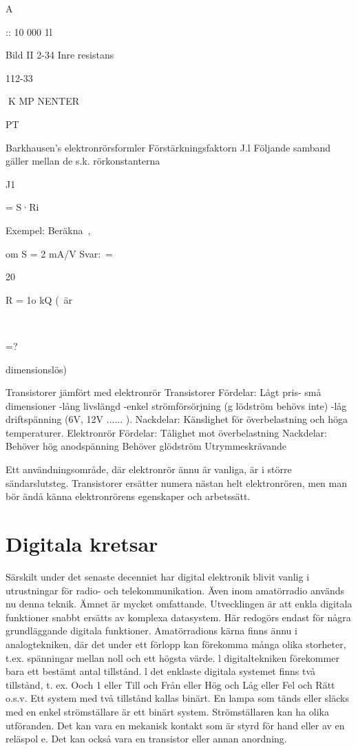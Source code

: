 {{A

:: 10 000 1l

Bild II 2-34 Inre resistans

112-33

K MP NENTER

PT

Barkhausen's elektronrörsformler
Förstärkningsfaktorn J.l
Följande samband gäller mellan de s.k. rörkonstanterna

J1

= S·Ri

Exempel:
Beräkna~,

om S = 2 mA/V
Svar:~=

20

R = 1o kQ
(~är

~

=?

dimensionslös)

Transistorer jämfört med elektronrör
Transistorer
Fördelar:
Lågt pris- små dimensioner -lång livslängd
-enkel strömförsörjning (g lödström behövs
inte) -låg driftspänning (6V, 12V ...... ).
Nackdelar:
Känslighet för överbelastning och höga
temperaturer.
Elektronrör
Fördelar:
Tålighet mot överbelastning
Nackdelar:
Behöver hög anodspänning
Behöver glödström
Utrymmeskrävande

Ett användningsområde, där elektronrör
ännu är vanliga, är i större sändarslutsteg.
Transistorer ersätter numera nästan helt
elektronrören, men man bör ändå känna
elektronrörens egenskaper och arbetssätt.

\section{Digitala kretsar}

Särskilt under det senaste decenniet har
digital elektronik blivit vanlig i utrustningar
för radio- och telekommunikation. Även inom
amatörradio används nu denna teknik. Ämnet är mycket omfattande. Utvecklingen är
att enkla digitala funktioner snabbt ersätts av
komplexa datasystem. Här redogörs endast
för några grundläggande digitala funktioner.
Amatörradions kärna finns ännu i analogtekniken, där det under ett förlopp kan förekomma många olika storheter, t.ex. spänningar mellan noll och ett högsta värde.
l digitaltekniken förekommer bara ett bestämt antal tillstånd. l det enklaste digitala
systemet finns två tillstånd, t. ex. Ooch 1 eller
Till och Från eller Hög och Låg eller Fel och
Rätt o.s.v. Ett system med två tillstånd kallas
binärt. En lampa som tänds eller släcks med
en enkel strömställare är ett binärt system.
Strömställaren kan ha olika utföranden. Det
kan vara en mekanisk kontakt som är styrd
för hand eller av en reläspol e. Det kan också
vara en transistor eller annan anordning.

}}
